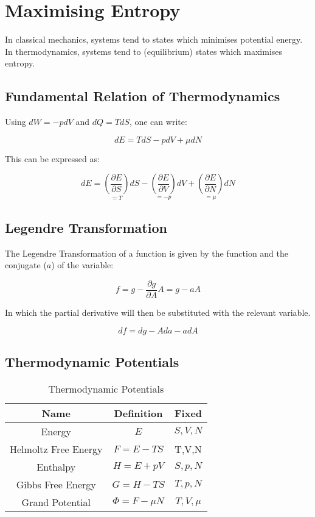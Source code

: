 \documentclass[12pt]{article}
\begin{document}
\section{Maximising Entropy}

In classical mechanics, systems tend to states which minimises potential energy. In thermodynamics, systems tend to (equilibrium) states which maximises entropy.

\subsection{Fundamental Relation of Thermodynamics}

Using $dW = -pdV$ and $dQ = TdS$, one can write:

\[\boxed{dE = TdS - pdV + \mu dN}\]

This can be expressed as:

\[
dE = \underset{=T}{\left(\frac{\partial E}{\partial S}\right)}dS - \underset{=-p}{\left(\frac{\partial E}{\partial V}\right)}dV + \underset{=\mu}{\left(\frac{\partial E}{\partial N}\right)} dN
\]


\subsection{Legendre Transformation}

The Legendre Transformation of a function is given by the function and the conjugate ($a$) of the variable:

\[ f = g - \frac{\partial g}{\partial A}A = g - aA\]

In which the partial derivative will then be substituted with the relevant variable. 

\[df = dg - Ada - adA\]

\subsection{Thermodynamic Potentials}

\begin{table}[h]
    \centering
    \begin{tabular}{|c|c|c|}
    \hline
         Name &  Definition & Fixed\\
    \hline
         Energy & $E$         & $S,V,N$\\
         Helmoltz Free Energy & $F = E-TS$& T,V,N\\
         Enthalpy & $H = E + pV$ & $S, p, N$\\
         Gibbs Free Energy & $G = H - TS$ & $T, p, N$\\
         Grand Potential & $\Phi=F -\mu N$ & $T,V, \mu$\\
         \hline
    \end{tabular}
    \caption{Thermodynamic Potentials}
    \label{tab:thermopotential}
\end{table}
\end{document}
